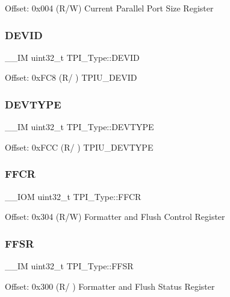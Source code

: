 Offset\+: 0x004 (R/W) Current Parallel Port Size Register \mbox{\label{structTPI__Type_abc0ecda8a5446bc754080276bad77514}} 
\subsubsection{\texorpdfstring{DEVID}{DEVID}}
{\footnotesize\ttfamily \+\_\+\+\_\+\+IM uint32\+\_\+t T\+P\+I\+\_\+\+Type\+::\+D\+E\+V\+ID}

Offset\+: 0x\+F\+C8 (R/ ) T\+P\+I\+U\+\_\+\+D\+E\+V\+ID \mbox{\label{structTPI__Type_ad98855854a719bbea33061e71529a472}} 
\subsubsection{\texorpdfstring{DEVTYPE}{DEVTYPE}}
{\footnotesize\ttfamily \+\_\+\+\_\+\+IM uint32\+\_\+t T\+P\+I\+\_\+\+Type\+::\+D\+E\+V\+T\+Y\+PE}

Offset\+: 0x\+F\+CC (R/ ) T\+P\+I\+U\+\_\+\+D\+E\+V\+T\+Y\+PE \mbox{\label{structTPI__Type_a3f68b6e73561b4849ebf953a894df8d2}} 
\subsubsection{\texorpdfstring{FFCR}{FFCR}}
{\footnotesize\ttfamily \+\_\+\+\_\+\+I\+OM uint32\+\_\+t T\+P\+I\+\_\+\+Type\+::\+F\+F\+CR}

Offset\+: 0x304 (R/W) Formatter and Flush Control Register \mbox{\label{structTPI__Type_a6c47a0b4c7ffc66093ef993d36bb441c}} 
\subsubsection{\texorpdfstring{FFSR}{FFSR}}
{\footnotesize\ttfamily \+\_\+\+\_\+\+IM uint32\+\_\+t T\+P\+I\+\_\+\+Type\+::\+F\+F\+SR}

Offset\+: 0x300 (R/ ) Formatter and Flush Status Register \mbox{\label{structTPI__Type_aa4d7b5cf39dff9f53bf7f69bc287a814}} 
